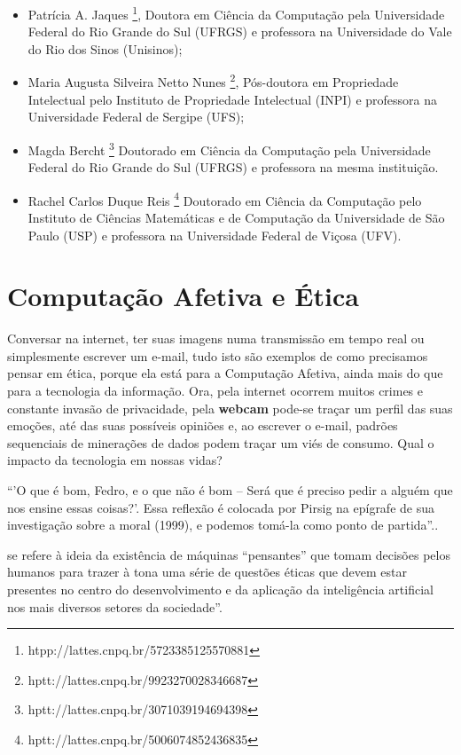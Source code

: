 \documentclass[
	12pt,				    %
	openright,			    %
	oneside,			    %
	a4paper,			    %
    sumario=tradicional,    %
	english,			    %
	brazil,				    %
	]{abntex2}              %
\begin{document}
\begin{itemize}
  \item Patrícia A. Jaques \footnote[1]{htpp://lattes.cnpq.br/5723385125570881}, Doutora em Ciência da Computação pela Universidade Federal do Rio Grande do Sul (UFRGS) e professora na Universidade do Vale do Rio dos Sinos (Unisinos);
  \item Maria Augusta Silveira Netto Nunes
  \footnote[2]{hptt://lattes.cnpq.br/9923270028346687},
  Pós-doutora em Propriedade Intelectual pelo Instituto de Propriedade Intelectual (INPI) e professora na Universidade Federal de Sergipe (UFS);
  \item Magda Bercht
  \footnote[3]{hptt://lattes.cnpq.br/3071039194694398}
  Doutorado em Ciência da Computação pela Universidade Federal do Rio Grande do Sul (UFRGS) e professora na mesma instituição.
  \item Rachel Carlos Duque Reis
  \footnote[4]{hptt://lattes.cnpq.br/5006074852436835}
  Doutorado em Ciência da Computação pelo Instituto de Ciências Matemáticas e de Computação da Universidade de São Paulo (USP) e professora na Universidade Federal de Viçosa (UFV).
\end{itemize}

\section{Computação Afetiva e Ética}

Conversar na internet, ter suas imagens numa transmissão em tempo real ou simplesmente escrever um e-mail, tudo isto são exemplos de como precisamos pensar em ética, porque ela está para a Computação Afetiva, ainda mais do que para a tecnologia da informação. Ora, pela internet ocorrem muitos crimes e constante invasão de privacidade, pela \textbf{webcam} pode-se traçar um perfil das suas emoções, até das suas possíveis opiniões e, ao escrever o e-mail, padrões sequenciais de minerações de dados podem traçar um viés de consumo. Qual o impacto da tecnologia em nossas vidas?

``'O que é bom, Fedro, e o que não é bom – Será que é preciso pedir a alguém que nos ensine essas coisas?'. Essa reflexão é colocada por Pirsig na epígrafe de sua investigação sobre a moral (1999), e podemos tomá-la como ponto de partida''.\cite{Holanda2018}.

 se refere à ideia da existência de máquinas “pensantes” que tomam decisões pelos humanos para trazer à tona uma série de questões éticas que devem estar presentes no centro do desenvolvimento e da aplicação da inteligência artificial nos mais diversos setores da sociedade''.
\end{document}
